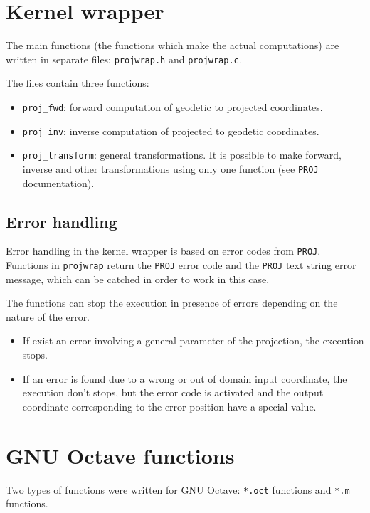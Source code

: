 \documentclass[10pt,a4paper]{article}
\newcommand{\proj}{\texttt{PROJ}}
\newcommand{\octave}{GNU Octave}
\begin{document}
\section{Kernel wrapper}
\label{op-kw}

The main functions (the functions which make the actual computations) are
written in separate files: \texttt{projwrap.h} and \texttt{projwrap.c}.

The files contain three functions:
\begin{itemize}
\item \texttt{proj\_fwd}: forward computation of geodetic to projected
      coordinates.
\item \texttt{proj\_inv}: inverse computation of projected to geodetic
      coordinates.
\item \texttt{proj\_transform}: general transformations. It is possible to make
      forward, inverse and other transformations using only one function (see
      \proj{} documentation).
\end{itemize}

\subsection{Error handling}

Error handling in the kernel wrapper is based on error codes from \proj.
Functions in \texttt{projwrap} return the \proj{} error code and the \proj{}
text string error message, which can be catched in order to work in this case.

The functions can stop the execution in presence of errors depending on the
nature of the error.
\begin{itemize}
\item If exist an error involving a general parameter of the projection, the
      execution stops.
\item If an error is found due to a wrong or out of domain input coordinate, the
      execution don't stops, but the error code is activated and the output
      coordinate corresponding to the error position have a special value.
\end{itemize}

\section{\octave{} functions}

Two types of functions were written for \octave: \texttt{*.oct} functions and
\texttt{*.m} functions.
\end{document}
